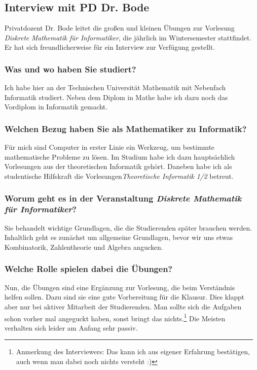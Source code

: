 \begin{multicols}{2}
\subsection{Interview mit PD Dr. Bode}
	Privatdozent Dr. Bode leitet die großen und kleinen Übungen zur Vorlesung \emph{Diskrete Mathematik für Informatiker}, die jährlich im Wintersemester stattfindet. Er hat sich freundlicherweise für ein Interview zur Verfügung gestellt.
	
	\subsubsection{Was und wo haben Sie studiert?}
		Ich habe hier an der Technischen Universität Mathematik mit Nebenfach Informatik studiert. Neben dem Diplom in Mathe habe ich dazu noch das Vordiplom in Informatik gemacht.

	\subsubsection{Welchen Bezug haben Sie als Mathematiker zu Informatik?}
		Für mich sind Computer in erster Linie ein Werkzeug, um bestimmte mathematische Probleme zu lösen. Im Studium habe ich dazu hauptsächlich Vorlesungen aus der theoretischen Informatik gehört. Daneben habe ich als studentische Hilfskraft die Vorlesungen\emph{Theoretische Informatik 1/2} betreut.

	\subsubsection{Worum geht es in der Veranstaltung \emph{Diskrete Mathematik für Informatiker}?}
		Sie behandelt wichtige Grundlagen, die die Studierenden später brauchen werden. Inhaltlich geht es zunächst um allgemeine Grundlagen, bevor wir uns etwas Kombinatorik, Zahlentheorie und Algebra angucken.

	\subsubsection{Welche Rolle spielen dabei die Übungen?}
		Nun, die Übungen sind eine Ergänzung zur Vorlesung, die beim Verständnis helfen sollen. Dazu sind sie eine gute Vorbereitung für die Klausur. Dies klappt aber nur bei aktiver Mitarbeit der Studierenden. Man sollte sich die Aufgaben schon vorher mal angeguckt haben, sonst bringt das nichts.\footnote{Anmerkung des Interviewers: Das kann ich aus eigener Erfahrung bestätigen, auch wenn man dabei noch nichts versteht :)} Die Meisten verhalten sich leider am Anfang sehr passiv.


\end{multicols}
